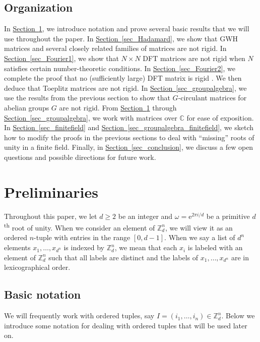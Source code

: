 \documentclass[11pt]{article}
\numberwithin{equation}{section}
\theoremstyle{definition}
\theoremstyle{plain}
\newcommand{\C}{\mathbb C}
\newcommand{\Z}{\mathbb Z}
\newcommand{\eee}{\mathrm e}
\newcommand{\expref}[2]{\hyperref[#2]{#1~\ref{#2}}}
\theoremstyle{definition}
\renewcommand\Z{{\mathbb{Z}}}
\renewcommand\C{{\mathbb{C}}}
\newcommand{\ts}{\textsuperscript}
\begin{document}
\subsection{Organization}
In \expref{Section}{sec_prelim}, we introduce notation and prove several basic results that we will use throughout the paper.  In \expref{Section}{sec_Hadamard}, we show that %
GWH matrices  %
and several closely related families of matrices are not rigid.  In \expref{Section}{sec_Fourier1}, we show that $N \times N$ %
DFT %
 matrices are not rigid when $N$ satisfies certain number-theoretic
%
conditions.   %
In \expref{Section}{sec_Fourier2}, we complete the proof that %
no (sufficiently large) DFT matrix is rigid%
. We then deduce that %
%
 Toeplitz matrices are not rigid.  In \expref{Section}{sec_groupalgebra}, we use the results from the previous section to show that 
%
$G$-circulant    %
matrices for abelian groups $G$   %
are not rigid.  {}From \expref{Section}{sec_prelim} through \expref{Section}{sec_groupalgebra}, we work with matrices over $\C$ for ease of exposition.  In \expref{Section}{sec_finitefield} and \expref{Section}{sec_groupalgebra_finitefield}, we sketch how to modify the proofs in the previous sections to deal with ``missing'' roots of unity in a finite field.  
%
%
Finally, in \expref{Section}{sec_conclusion}, we discuss a few open questions
and possible directions for future work.



\section{Preliminaries}\label{sec_prelim}
Throughout this paper, we let $d \geq 2$ be an integer and $\omega = \eee^{2\pi i/d}$ be a primitive $d$\ts{th} root of unity.  When we consider an element of $\Z_d^n$, we will view it as an ordered $n$-tuple with entries in the range $[0,d-1]$.  When we say a list of $d^n$ elements $x_1, \dots , x_{d^n}$ is indexed by $\Z_d^n$, we mean that each $x_i$ is labeled with an element of $\Z_d^n$ such that all labels are distinct and the labels of $x_1, \dots , x_{d^n}$ are in lexicographical order. 

%
\subsection{Basic notation}     %
We will frequently work with ordered tuples, say $I = (i_1, \dots , i_n) \in \Z_d^n$.  Below we introduce some notation for dealing with ordered tuples that will be used later on.
\end{document}
